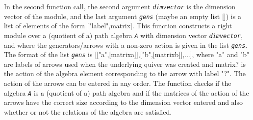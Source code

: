 \documentclass[a4paper,11pt]{report}
\begin{document}
{{{ In the second function call, the second argument \mbox{\texttt{\slshape dim{\textunderscore}vector}} is the dimension vector of the module, and the last argument \mbox{\texttt{\slshape gens}} (maybe an empty list []) is a list of elements of the form ["label",matrix].
This function constructs a right module over a (quotient of a) path algebra \mbox{\texttt{\slshape A}} with dimension vector \mbox{\texttt{\slshape dim{\textunderscore}vector}}, and where the generators/arrows with a non-zero action is given in the list \mbox{\texttt{\slshape gens}}. The format of the list \mbox{\texttt{\slshape gens}} is [["a",[matrix{\textunderscore}a]],["b",[matrix{\textunderscore}b]],...],
where "a" and "b" are labels of arrows used when the underlying quiver was
created and matrix{\textunderscore}? is the action of the algebra element
corresponding to the arrow with label "?". The action of the arrows can be
entered in any order. The function checks if the algebra \mbox{\texttt{\slshape A}} is a (quotient of a) path algebra and if the matrices of the action of the
arrows have the correct size according to the dimension vector entered and
also whether or not the relations of the algebra are satisfied. }

}}
\end{document}
